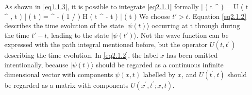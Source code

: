 As shown in \eqref{eq1.1.3}, it is possible to integrate \eqref{eq2.1.1} formally
\be\label{eq2.1.2}
| \psi \left( t ^ { \prime } \right) \rangle = U \left( t ^ { \prime } , t \right) | \psi ( t ) \rangle =  ^ { - ( 1 / \hbar ) H \left( t ^ { \prime } - t \right) } | \psi ( t ) \rangle
\ee
We choose $t' > t$. Equation \eqref{eq2.1.2} describes the time evolution of the state $| \psi ( t ) \rangle$ occurring at t through during the time $t'-t$, leading to the state $| \psi ( t' ) \rangle$. Not the wave function can be expressed with the path integral mentioned before, but the operator $U \left( t , t ^ { \prime } \right)$ describing the time evolution. In \eqref{eq2.1.2}, the label $x$ has been omitted intentionally, because $| \psi ( t ) \rangle$ should be regarded as a continuous infinite dimensional vector with components $\psi ( x , t )$ labelled by $x$, and $U \left( t ^ { \prime } , t \right)$ should be regarded as a matrix with components $U \left( x ^ { \prime } , t ^ { \prime } ; x , t \right)$. 






























































































